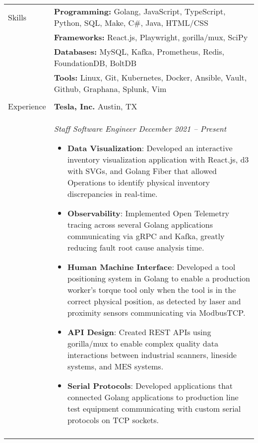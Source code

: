 \documentclass[11pt]{article}
\begin{document}
\noindent
\begin{tabular}[t]{@{}p{1.05in} @{}p{6.00in}}

{Skills}
&
\textbf{Programming:} Golang, JavaScript, TypeScript, Python, SQL, Make, C\#, Java, HTML/CSS%
\\
&
\textbf{Frameworks:} React.js, Playwright, gorilla/mux, SciPy%
\\
&
\textbf{Databases:} MySQL, Kafka, Prometheus, Redis, FoundationDB, BoltDB%
\\
&
\textbf{Tools:} Linux, Git, Kubernetes, Docker, Ansible, Vault, Github, Graphana, Splunk, Vim%
\\
\\

{Experience}
&
\textbf{Tesla, Inc.}  \hfill Austin, TX \\ &
 
    \textit{Staff Software Engineer \hfill December 2021 -- Present}
        \begin{itemize}[noitemsep,topsep=0pt]
            \item \textbf{Data Visualization}: Developed an interactive inventory visualization application with React.js, d3 with SVGs, and Golang Fiber that allowed Operations to identify physical inventory discrepancies in real-time.%
            \item \textbf{Observability}: Implemented Open Telemetry tracing across several Golang applications communicating via gRPC and Kafka, greatly reducing fault root cause analysis time.%
            \item \textbf{Human Machine Interface}: Developed a tool positioning system in Golang to enable a production worker's torque tool only when the tool is in the correct physical position, as detected by laser and proximity sensors communicating via ModbusTCP.%
            \item \textbf{API Design}: Created REST APIs using gorilla/mux to enable complex quality data interactions between industrial scanners, lineside systems, and MES systems.%
            \item \textbf{Serial Protocols}: Developed applications that connected Golang applications to production line test equipment communicating with custom serial protocols on TCP sockets.%
        \end{itemize}
\\ &
 

\end{tabular}
\end{document}
